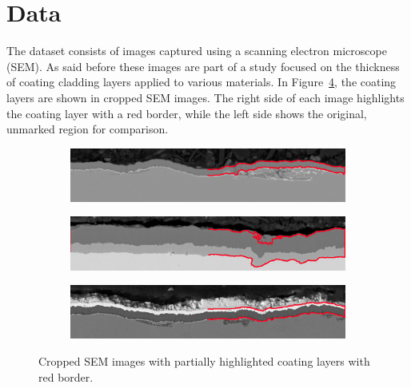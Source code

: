 \section{Data}\label{sec:data}

The dataset consists of images captured using a scanning electron microscope (SEM). As said before these images are part of a study focused on the thickness of coating cladding layers applied to various materials. In Figure~\ref{fig:three-images}, the coating layers are shown in cropped SEM images. The right side of each image highlights the coating layer with a red border, while the left side shows the original, unmarked region for comparison. 

\begin{figure}[H]
    \centering


    \begin{subfigure}{0.8\textwidth}
        \centering
        \includegraphics[width=\linewidth]{PICTURES/original_data/11_crop.png}
        \label{fig:subfig1}
    \end{subfigure}

    \vspace{0.5em}

    \begin{subfigure}{0.8\textwidth}
        \centering
        \includegraphics[width=\linewidth]{PICTURES/original_data/177_crop.png}
        \label{fig:subfig2}
    \end{subfigure}

    \vspace{0.5em}

    \begin{subfigure}{0.8\textwidth}
        \centering
        \includegraphics[width=\linewidth]{PICTURES/original_data/208_crop.png}
        \label{fig:subfig3}
    \end{subfigure}

    \caption{Cropped SEM images with partially highlighted coating layers with red border.}
    \label{fig:three-images}
    \end{figure}

